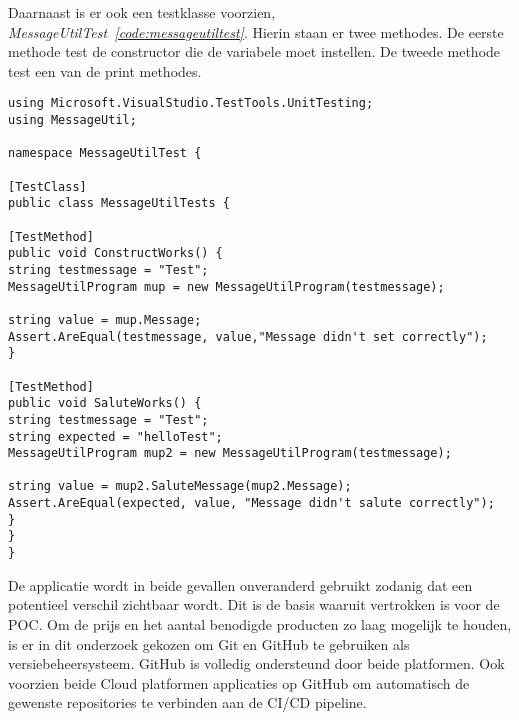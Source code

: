 Daarnaast is er ook een testklasse voorzien, \emph{MessageUtilTest~\ref{code:messageutiltest}}. Hierin staan er twee methodes. De eerste methode test de constructor die de variabele moet instellen. De tweede methode test een van de print methodes.

\begin{lstlisting}
using Microsoft.VisualStudio.TestTools.UnitTesting;
using MessageUtil;

namespace MessageUtilTest {

[TestClass]
public class MessageUtilTests {

[TestMethod]
public void ConstructWorks() {
string testmessage = "Test";
MessageUtilProgram mup = new MessageUtilProgram(testmessage);

string value = mup.Message;
Assert.AreEqual(testmessage, value,"Message didn't set correctly");
}

[TestMethod]
public void SaluteWorks() {
string testmessage = "Test";
string expected = "helloTest";
MessageUtilProgram mup2 = new MessageUtilProgram(testmessage);

string value = mup2.SaluteMessage(mup2.Message);
Assert.AreEqual(expected, value, "Message didn't salute correctly");
}
}
}

\end{lstlisting}

De applicatie wordt in beide gevallen onveranderd gebruikt zodanig dat een potentieel verschil zichtbaar wordt. Dit is de basis waaruit vertrokken is voor de POC. Om de prijs en het aantal benodigde producten zo laag mogelijk te houden, is er in dit onderzoek gekozen om Git en GitHub te gebruiken als versiebeheersysteem. GitHub is volledig ondersteund door beide platformen. Ook voorzien beide Cloud platformen applicaties op GitHub om automatisch de gewenste repositories te verbinden aan de CI/CD pipeline.

